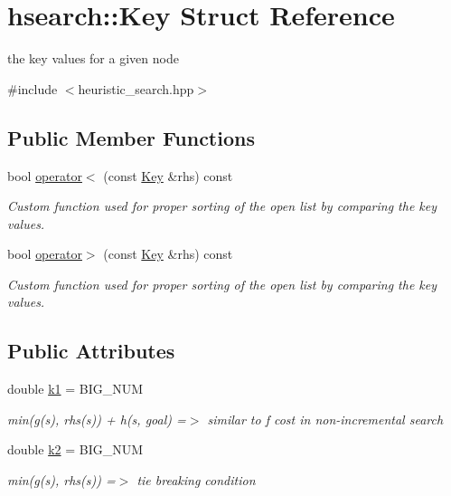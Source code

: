 \hypertarget{structhsearch_1_1Key}{}\section{hsearch\+:\+:Key Struct Reference}
\label{structhsearch_1_1Key}


the key values for a given node  




{\ttfamily \#include $<$heuristic\+\_\+search.\+hpp$>$}

\subsection*{Public Member Functions}
\begin{DoxyCompactItemize}
\item 
bool \hyperlink{structhsearch_1_1Key_a869b0689bb15fdd6e5578f9d4fc466a6}{operator$<$} (const \hyperlink{structhsearch_1_1Key}{Key} \&rhs) const
\begin{DoxyCompactList}\small\item\em Custom function used for proper sorting of the open list by comparing the key values. \end{DoxyCompactList}\item 
bool \hyperlink{structhsearch_1_1Key_a14fb1a53446fb9be30c4d8d584406511}{operator$>$} (const \hyperlink{structhsearch_1_1Key}{Key} \&rhs) const
\begin{DoxyCompactList}\small\item\em Custom function used for proper sorting of the open list by comparing the key values. \end{DoxyCompactList}\end{DoxyCompactItemize}
\subsection*{Public Attributes}
\begin{DoxyCompactItemize}
\item 
\mbox{\label{structhsearch_1_1Key_a25799f303c869b7406796f08d0db924a}} 
double \hyperlink{structhsearch_1_1Key_a25799f303c869b7406796f08d0db924a}{k1} = B\+I\+G\+\_\+\+N\+UM
\begin{DoxyCompactList}\small\item\em min(g(s), rhs(s)) + h(s, goal) =$>$ similar to f cost in non-\/incremental search \end{DoxyCompactList}\item 
\mbox{\label{structhsearch_1_1Key_ad759545484e29eaaf8d462852e4f9de5}} 
double \hyperlink{structhsearch_1_1Key_ad759545484e29eaaf8d462852e4f9de5}{k2} = B\+I\+G\+\_\+\+N\+UM
\begin{DoxyCompactList}\small\item\em min(g(s), rhs(s)) =$>$ tie breaking condition \end{DoxyCompactList}\end{DoxyCompactItemize}


